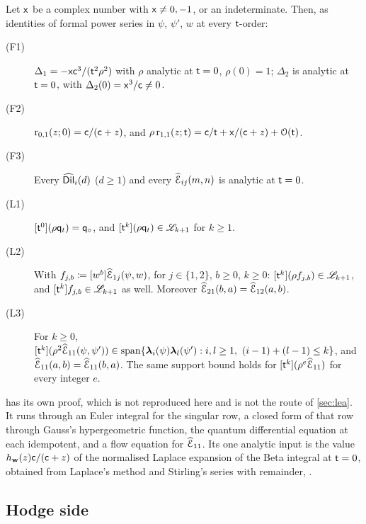 \begin{thm}
\label{thm:con-leaf}
Let $\mathsf{x}$ be a complex number with $\mathsf{x}\neq 0,-1$, or an indeterminate. Then, as identities of formal power series in $\psi$, $\psi'$, $w$ at every $\mathsf{t}$-order:
\begin{description}
\item[(F1)] $\Delta_1=-\mathsf{x}\mathsf{c}^3/(\mathsf{t}^2\rho^2)$ with $\rho$ analytic at $\mathsf{t}=0$, $\rho(0)=1$; $\Delta_2$ is analytic at $\mathsf{t}=0$, with $\Delta_2(0)=\mathsf{x}^3/\mathsf{c}\neq 0$.
\item[(F2)] $\mathrm{r}_{0,1}(z;0)=\mathsf{c}/(\mathsf{c}+z)$, and $\rho\,\mathrm{r}_{1,1}(z;\mathsf{t})=\mathsf{c}/\mathsf{t}+\mathsf{x}/(\mathsf{c}+z)+\mathcal{O}(\mathsf{t})$.
\item[(F3)] Every $\widehat{\mathsf{Dil}}_i(d)$ ($d\geq 1$) and every $\widehat{\mathcal{E}}_{ij}(m,n)$ is analytic at $\mathsf{t}=0$.
\item[(L1)] $[\mathsf{t}^0](\rho\mathsf{q}_{t})=\mathsf{q}_{\circ}$, and $[\mathsf{t}^k](\rho\mathsf{q}_{t})\in\mathscr{L}_{k+1}$ for $k\geq 1$.
\item[(L2)] With $f_{j,b}\coloneqq[w^b]\widehat{\mathcal{E}}_{1j}(\psi,w)$, for $j\in\{1,2\}$, $b\geq 0$, $k\geq 0$: $[\mathsf{t}^k](\rho f_{j,b})\in\mathscr{L}_{k+1}$, and $[\mathsf{t}^k]f_{j,b}\in\mathscr{L}_{k+1}$ as well. Moreover $\widehat{\mathcal{E}}_{21}(b,a)=\widehat{\mathcal{E}}_{12}(a,b)$.
\item[(L3)] For $k\geq 0$, $[\mathsf{t}^k](\rho^2\widehat{\mathcal{E}}_{11}(\psi,\psi'))\in\mathrm{span}\{\boldsymbol{\lambda}_i(\psi)\boldsymbol{\lambda}_l(\psi'):i,l\geq 1,\ (i-1)+(l-1)\leq k\}$, and $\widehat{\mathcal{E}}_{11}(a,b)=\widehat{\mathcal{E}}_{11}(b,a)$. The same support bound holds for $[\mathsf{t}^k](\rho^e\widehat{\mathcal{E}}_{11})$ for every integer $e$.
\end{description}
\end{thm}

\begin{rmk}
 has its own proof, which is not reproduced here and is not the route of \cref{sec:lea}. It runs through an Euler integral for the singular row, a closed form of that row through Gauss's hypergeometric function, the quantum differential equation at each idempotent, and a flow equation for $\widehat{\mathcal{E}}_{11}$. Its one analytic input is the value $h_{\mathbf{w}}(z)\mathsf{c}/(\mathsf{c}+z)$ of the normalised Laplace expansion of the Beta integral at $\mathsf{t}=0$, obtained from Laplace's method and Stirling's series with remainder, \cite[5.11.1, Section~5.11(ii)]{DLMF}. 
\end{rmk}

\subsection{Hodge side}

